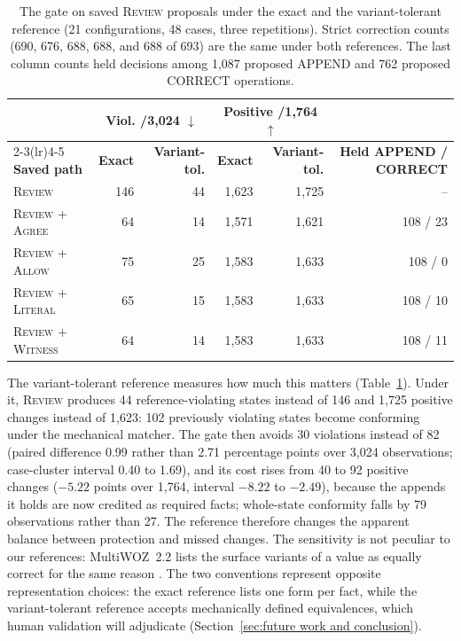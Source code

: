 \documentclass[acmsmall,review]{acmart}
\newcommand{\agree}{\textsc{Agree}}
\newcommand{\allow}{\textsc{Allow}}
\newcommand{\literal}{\textsc{Literal}}
\newcommand{\witness}{\textsc{Witness}}
\newcommand{\review}{\textsc{Review}}
\begin{document}
\begin{table}[tbp]
\centering
\caption{The gate on saved \review{} proposals under the exact and the variant-tolerant reference (21 configurations, 48 cases, three repetitions). Strict correction counts (690, 676, 688, 688, and 688 of 693) are the same under both references. The last column counts held decisions among 1,087 proposed APPEND and 762 proposed CORRECT operations.}\label{tab:10}
\small
\setlength{\tabcolsep}{3pt}
\begin{tabular}{@{}lrrrrr@{}}
\toprule
 & \multicolumn{2}{c}{\textbf{Viol. /3,024 $\downarrow$}} & \multicolumn{2}{c}{\textbf{Positive /1,764 $\uparrow$}} & \\
\cmidrule(lr){2-3}\cmidrule(lr){4-5}
\textbf{Saved path} & \textbf{Exact} & \textbf{Variant-tol.} & \textbf{Exact} & \textbf{Variant-tol.} & \textbf{Held APPEND / CORRECT} \\
\midrule
\review{} & 146 & 44 & 1,623 & 1,725 & -- \\
\review{} + \agree{} & 64 & 14 & 1,571 & 1,621 & 108 / 23 \\
\review{} + \allow{} & 75 & 25 & 1,583 & 1,633 & 108 / 0 \\
\review{} + \literal{} & 65 & 15 & 1,583 & 1,633 & 108 / 10 \\
\review{} + \witness{} & 64 & 14 & 1,583 & 1,633 & 108 / 11 \\
\bottomrule
\end{tabular}
\end{table}

The variant-tolerant reference measures how much this matters (Table~\ref{tab:10}). Under it, \review{} produces 44 reference-violating states instead of 146 and 1,725 positive changes instead of 1,623: 102 previously violating states become conforming under the mechanical matcher. The gate then avoids 30 violations instead of 82 (paired difference 0.99 rather than 2.71 percentage points over 3,024 observations; case-cluster interval 0.40 to 1.69), and its cost rises from 40 to 92 positive changes ($-5.22$ points over 1,764, interval $-8.22$ to $-2.49$), because the appends it holds are now credited as required facts; whole-state conformity falls by 79 observations rather than 27. The reference therefore changes the apparent balance between protection and missed changes. The sensitivity is not peculiar to our references: MultiWOZ~2.2 lists the surface variants of a value as equally correct for the same reason \cite{cite44}. The two conventions represent opposite representation choices: the exact reference lists one form per fact, while the variant-tolerant reference accepts mechanically defined equivalences, which human validation will adjudicate (Section~\ref{sec:future work and conclusion}).
\end{document}
